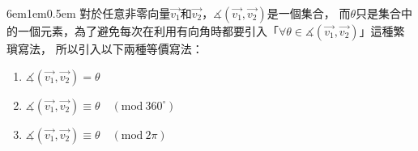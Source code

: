 \documentclass[12pt]{article}
\begin{document}
\begin{mybox}[集合-角度]{6em}{1em}{0.5em}
    對於任意非零向量$\overrightarrow{v_1}$和$\overrightarrow{v_2}$，$\measuredangle{\left(\overrightarrow{v_1},\overrightarrow{v_2}\right)}$是一個集合，
    而$\theta$只是集合中的一個元素，為了避免每次在利用有向角時都要引入「$\forall \theta\in\measuredangle{\left(\overrightarrow{v_1},\overrightarrow{v_2}\right)}$」這種繁瑣寫法，
    所以引入以下兩種等價寫法：
    \begin{enumerate}
        \item $\measuredangle{\left(\overrightarrow{v_1},\overrightarrow{v_2}\right)}=\theta$
        \item $\measuredangle{\left(\overrightarrow{v_1},\overrightarrow{v_2}\right)}\equiv\theta\quad\left(\text{mod}\ {360^{\circ}}\right)$
        \item $\measuredangle{\left(\overrightarrow{v_1},\overrightarrow{v_2}\right)}\equiv\theta\quad\left(\text{mod}\ {2\pi}\right)$
    \end{enumerate}
\end{mybox}
\end{document}
